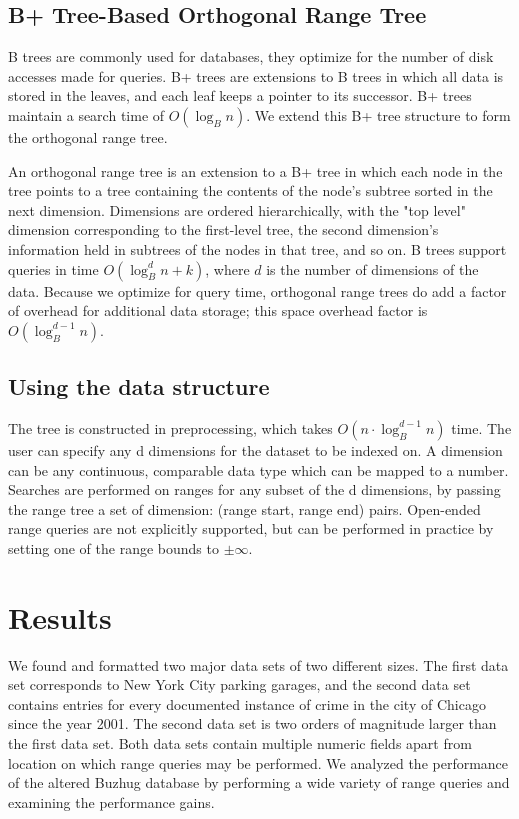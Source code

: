 \documentclass[11pt, oneside]{article}
\begin{document}
\subsection{B+ Tree-Based Orthogonal Range Tree}
B trees are commonly used for databases, they optimize for the number of disk accesses made for queries. B+ trees are extensions to B trees in which all data is stored in the leaves, and each leaf keeps a pointer to its successor. B+ trees maintain a search time of $O(\log_B n)$. We extend this B+ tree structure to form the orthogonal range tree.

An orthogonal range tree is an extension to a B+ tree in which each node in the tree points to a tree containing the contents of the node's subtree sorted in the next dimension. Dimensions are ordered hierarchically, with the "top level" dimension corresponding to the first-level tree, the second  dimension's information held in subtrees of the nodes in that tree, and so on. B trees support queries in time $O(\log_B^d n + k)$, where $d$ is the number of dimensions of the data. Because we optimize for query time, orthogonal range trees do add a factor of overhead for additional data storage; this space overhead factor is $O(\log_B^{d-1} n)$.   
	
\subsection{Using the data structure}
The tree is constructed in preprocessing, which takes $O(n \cdot \log_B^{d-1} n)$ time. The user can specify any d dimensions for the dataset to be indexed on.
A dimension can be any continuous, comparable data type which can be mapped to a number.
Searches are performed on ranges for any subset of the d dimensions, by passing the range tree a set of {dimension: (range start, range end)} pairs. Open-ended range queries are not explicitly supported, but can be performed in practice by setting one of the range bounds to $\pm\infty$.

\section{Results}

We found and formatted two major data sets of two different sizes. The first data set corresponds to New York City parking garages, and the second data set contains entries for every documented instance of crime in the city of Chicago since the year 2001. The second data set is two orders of magnitude larger than the first data set. Both data sets contain multiple numeric fields apart from location on which range queries may be performed. We analyzed the performance of the altered Buzhug database by performing a wide variety of range queries and examining the performance gains.
\end{document}
